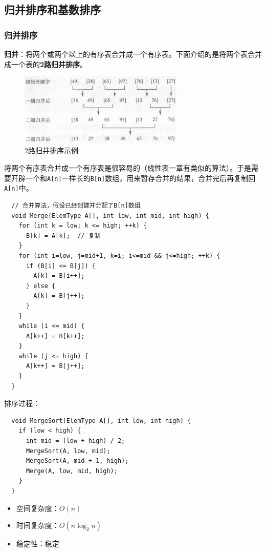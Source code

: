 \documentclass[12pt, a4paper, oneside]{ctexart}
\begin{document}
\subsection{归并排序和基数排序}

\subsubsection{归并排序}

\textbf{归并}：将两个或两个以上的有序表合并成一个有序表。下面介绍的是将两个表合并成一个表的\textbf{2路归并排序}。

\begin{figure}[h]
  \centering
  \includegraphics[width=0.7\textwidth]{./images/2-way-merge-sort.jpg}
  \caption{2路归并排序示例}
\end{figure}

将两个有序表合并成一个有序表是很容易的（线性表一章有类似的算法）。于是需要开辟一个和\verb|A[n]|一样长的\verb|B[n]|数组，用来暂存合并的结果，合并完后再复制回\verb|A[n]|中。

\begin{lstlisting}
  // 合并算法，假设已经创建并分配了B[n]数组
  void Merge(ElemType A[], int low, int mid, int high) {
    for (int k = low; k <= high; ++k) {
      B[k] = A[k];  // 复制
    }
    for (int i=low, j=mid+1, k=i; i<=mid && j<=high; ++k) {
      if (B[i] <= B[j]) {
        A[k] = B[i++];
      } else {
        A[k] = B[j++];
      }
    }
    while (i <= mid) {
      A[k++] = B[k++];
    }
    while (j <= high) {
      A[k++] = B[j++];
    }
  }
\end{lstlisting}

排序过程：
\begin{lstlisting}
  void MergeSort(ElemType A[], int low, int high) {
    if (low < high) {
      int mid = (low + high) / 2;
      MergeSort(A, low, mid);
      MergeSort(A, mid + 1, high);
      Merge(A, low, mid, high);
    }
  }
\end{lstlisting}

\begin{itemize}
  \item 空间复杂度：$O(n)$
  \item 时间复杂度：$O(n\log_2 n)$
  \item 稳定性：稳定
\end{itemize}
\end{document}
